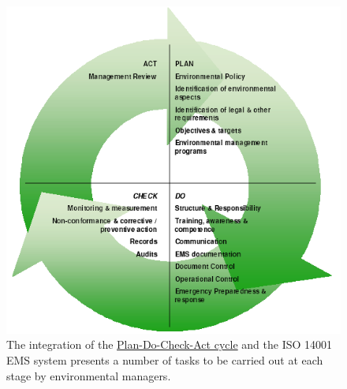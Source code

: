 \documentclass[11pt]{article}
\theoremstyle{definition}
\begin{document}
\begin{figure}[H]
	\centering
	\includegraphics[width=0.6\linewidth]{img/PDCA_cycle.png}
	\caption{The integration of the \href{https://emspr.weebly.com/pdca-stages.html}{Plan-Do-Check-Act cycle} and the ISO 14001 EMS system presents a number of tasks to be carried out at each stage by environmental managers.}
	\label{fig:PDCAcycle}
\end{figure}
\end{document}
